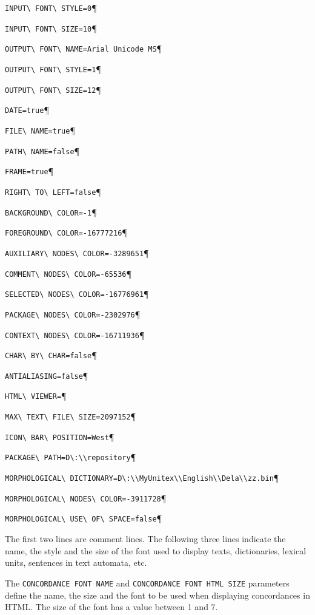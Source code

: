 \verb$INPUT\ FONT\ STYLE=0$\P

\verb$INPUT\ FONT\ SIZE=10$\P

\verb$OUTPUT\ FONT\ NAME=Arial Unicode MS$\P

\verb$OUTPUT\ FONT\ STYLE=1$\P

\verb$OUTPUT\ FONT\ SIZE=12$\P

\verb$DATE=true$\P

\verb$FILE\ NAME=true$\P

\verb$PATH\ NAME=false$\P

\verb$FRAME=true$\P

\verb$RIGHT\ TO\ LEFT=false$\P

\verb$BACKGROUND\ COLOR=-1$\P

\verb$FOREGROUND\ COLOR=-16777216$\P

\verb$AUXILIARY\ NODES\ COLOR=-3289651$\P

\verb$COMMENT\ NODES\ COLOR=-65536$\P

\verb$SELECTED\ NODES\ COLOR=-16776961$\P

\verb$PACKAGE\ NODES\ COLOR=-2302976$\P

\verb$CONTEXT\ NODES\ COLOR=-16711936$\P

\verb$CHAR\ BY\ CHAR=false$\P

\verb$ANTIALIASING=false$\P

\verb$HTML\ VIEWER=$\P

\verb$MAX\ TEXT\ FILE\ SIZE=2097152$\P

\verb$ICON\ BAR\ POSITION=West$\P

\verb$PACKAGE\ PATH=D\:\\repository$\P

\verb$MORPHOLOGICAL\ DICTIONARY=D\:\\MyUnitex\\English\\Dela\\zz.bin$\P

\verb$MORPHOLOGICAL\ NODES\ COLOR=-3911728$\P

\verb$MORPHOLOGICAL\ USE\ OF\ SPACE=false$\P


\bigskip
\noindent The first two lines are comment lines. The following three lines indicate the
name, the style and the size of the font used to display texts, dictionaries,
lexical units, sentences in text automata, etc.


\bigskip
\noindent The \verb$CONCORDANCE FONT NAME$ and \verb$CONCORDANCE FONT HTML SIZE$ parameters
define the name, the size and the font to be used when displaying concordances in
HTML. The size of the font has a value between 1 and 7.



